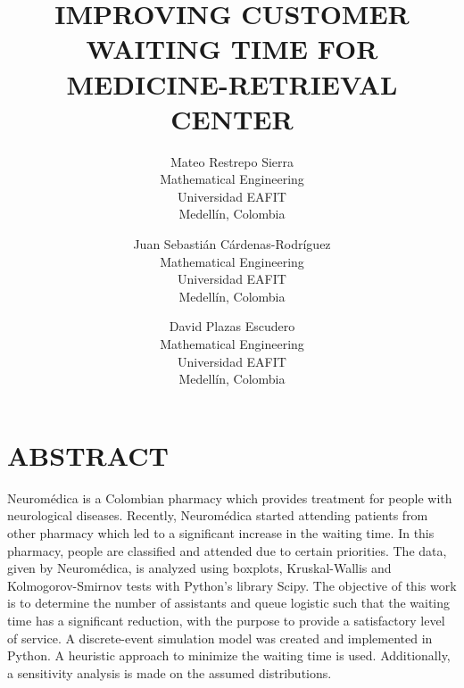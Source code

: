 \documentclass{wscpaperproc}
\theoremstyle{wsc}
\begin{document}
%
%


\title{IMPROVING CUSTOMER WAITING TIME FOR MEDICINE-RETRIEVAL CENTER}

\author{Mateo Restrepo Sierra\\ [12pt]
Mathematical Engineering\\
Universidad EAFIT\\
Medell\'in, Colombia\\
\and
Juan Sebasti\'an C\'ardenas-Rodr\'iguez \\[12pt]
Mathematical Engineering\\
Universidad EAFIT\\
Medell\'in, Colombia\\
\and
David Plazas Escudero\\ [12pt]
Mathematical Engineering\\
Universidad EAFIT\\
Medell\'in, Colombia
}






\maketitle

\section*{ABSTRACT}
Neuromédica is a Colombian pharmacy which provides treatment for people with
neurological diseases. Recently, Neuromédica started attending patients from
other pharmacy which led to a significant increase in the waiting time. In this
pharmacy, people are classified and attended due to certain priorities. The
data, given by Neuromédica, is analyzed using boxplots, Kruskal-Wallis and
Kolmogorov-Smirnov tests with Python's library Scipy. The objective of this work
is to determine the number of assistants and queue logistic such that the
waiting time has a significant reduction, with the purpose to provide a
satisfactory level of service. A discrete-event simulation model was created and
implemented in Python. A heuristic approach to minimize the waiting time is
used. Additionally, a sensitivity analysis is made on the assumed distributions.
\\
\end{document}
